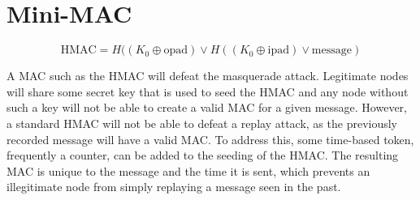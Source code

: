 \section{Mini-MAC}


$$ \text{HMAC} = H((K_0\oplus \text{opad})\vee H((K_0\oplus \text{ipad})\vee \text{message}) $$


	



A MAC such as the HMAC will defeat the masquerade attack. Legitimate nodes will share some secret key that is used to seed the HMAC and any node without such a key will not be able to create a valid MAC for a given message. However, a standard HMAC will not be able to defeat a replay attack, as the previously recorded message will have a valid MAC. To address this, some time-based token, frequently a counter, can be added to the seeding of the HMAC. The resulting MAC is unique to the message and the time it is sent, which prevents an illegitimate node from simply replaying a message seen in the past.


